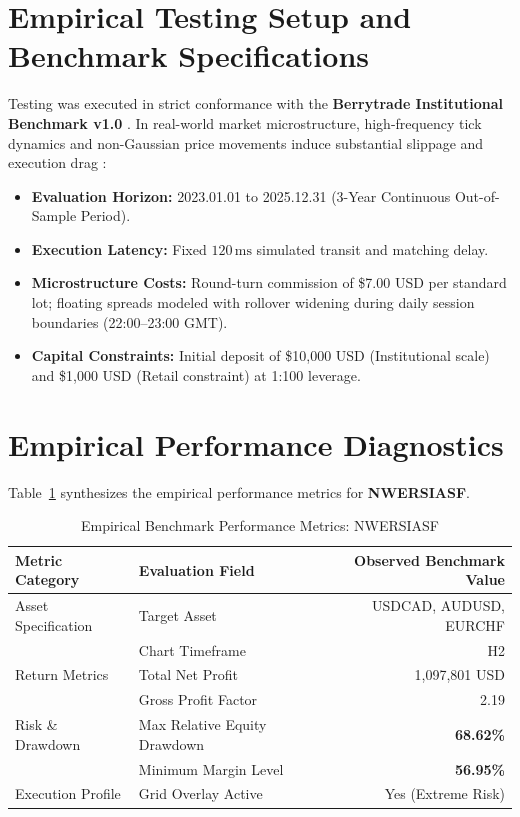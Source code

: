 \documentclass[11pt,a4paper]{article}
\begin{document}
\section{Empirical Testing Setup and Benchmark Specifications}
Testing was executed in strict conformance with the \textbf{Berrytrade Institutional Benchmark v1.0} \cite{artsu2026illusion}. In real-world market microstructure, high-frequency tick dynamics and non-Gaussian price movements induce substantial slippage and execution drag \cite{kyle1985continuous, amihud2002illiquidity, cont2001empirical, mandelbrot1963variation}:
\begin{itemize}
    \item \textbf{Evaluation Horizon:} 2023.01.01 to 2025.12.31 (3-Year Continuous Out-of-Sample Period).
    \item \textbf{Execution Latency:} Fixed $120\,\text{ms}$ simulated transit and matching delay.
    \item \textbf{Microstructure Costs:} Round-turn commission of \$7.00 USD per standard lot; floating spreads modeled with rollover widening during daily session boundaries (22:00--23:00 GMT).
    \item \textbf{Capital Constraints:} Initial deposit of \$10,000 USD (Institutional scale) and \$1,000 USD (Retail constraint) at 1:100 leverage.
\end{itemize}

\section{Empirical Performance Diagnostics}
Table~\ref{tab:metrics} synthesizes the empirical performance metrics for \textbf{NWERSIASF}.

\begin{table}[H]
\centering
\caption{Empirical Benchmark Performance Metrics: NWERSIASF}
\label{tab:metrics}
\begin{tabular}{llr}
\toprule
\textbf{Metric Category} & \textbf{Evaluation Field} & \textbf{Observed Benchmark Value} \\
\midrule
Asset Specification & Target Asset & USDCAD, AUDUSD, EURCHF \\
& Chart Timeframe & H2 \\
Return Metrics & Total Net Profit & 1,097,801 USD \\
& Gross Profit Factor & 2.19 \\
Risk \& Drawdown & Max Relative Equity Drawdown & \textbf{68.62\%} \\
& Minimum Margin Level & \textbf{56.95\%} \\
Execution Profile & Grid Overlay Active & Yes (Extreme Risk) \\
\bottomrule
\end{tabular}
\end{table}
\end{document}
